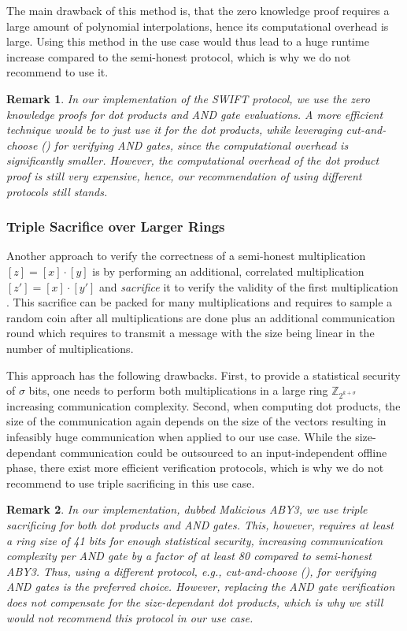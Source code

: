 \documentclass[a4paper,11pt,
]{article}
\newtheorem{remark}{Remark}
\newcommand{\Z}{\ensuremath{\mathbb{Z}}\xspace}
\newcommand{\shared}[1]{\ensuremath{[{#1}]}}
\begin{document}
The main drawback of this method is, that the zero knowledge proof requires a large amount of polynomial interpolations, hence its computational overhead is large. Using this method in the use case would thus lead to a huge runtime increase compared to the semi-honest protocol, which is why we do not recommend to use it.

\begin{remark}
    In our implementation of the SWIFT protocol, we use the zero knowledge proofs for dot products and AND gate evaluations. A more efficient technique would be to just use it for the dot products, while leveraging cut-and-choose () for verifying AND gates, since the computational overhead is significantly smaller. However, the computational overhead of the dot product proof is still very expensive, hence, our recommendation of using different protocols still stands.
\end{remark}

\subsubsection{Triple Sacrifice over Larger Rings} \label{sec:sacrifice}

Another approach to verify the correctness of a semi-honest multiplication $\shared{z} = \shared{x} \cdot \shared{y}$ is by performing an additional, correlated multiplication $\shared{z'} = \shared{x} \cdot \shared{y'}$ and \textit{sacrifice} it to verify the validity of the first multiplication \cite{DBLP:conf/acns/AbspoelD0N21}. This sacrifice can be packed for many multiplications and requires to sample a random coin after all multiplications are done plus an additional communication round which requires to transmit a message with the size being linear in the number of multiplications.

This approach has the following drawbacks. First, to provide a statistical security of $\sigma$ bits, one needs to perform both multiplications in a large ring $\Z_{2^{k+\sigma}}$ increasing communication complexity. Second, when computing dot products, the size of the communication again depends on the size of the vectors resulting in infeasibly huge communication when applied to our use case. While the size-dependant communication could be outsourced to an input-independent offline phase, there exist more efficient verification protocols, which is why we do not recommend to use triple sacrificing in this use case.

\begin{remark}
    In our implementation, dubbed Malicious ABY3, we use triple sacrificing for both dot products and AND gates. This, however, requires at least a ring size of 41 bits for enough statistical security, increasing communication complexity per AND gate by a factor of at least 80 compared to semi-honest ABY3. Thus, using a different protocol, e.g., cut-and-choose (), for verifying AND gates is the preferred choice. However, replacing the AND gate verification does not compensate for the size-dependant dot products, which is why we still would not recommend this protocol in our use case.
\end{remark}
\end{document}
